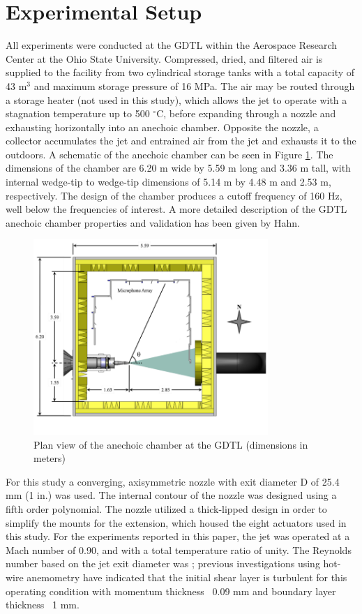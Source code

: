 \documentclass[english]{aiaa-tc}
\begin{document}
\section{Experimental Setup}
All experiments were conducted at the GDTL within the Aerospace Research Center at the Ohio State University. Compressed, dried, and filtered air is supplied to the facility from two cylindrical storage tanks with a total capacity of 43 m$^3$ and maximum storage pressure of 16 MPa. The air may be routed through a storage heater (not used in this study), which allows the jet to operate with a stagnation temperature up to 500 $^\circ$C, before expanding through a nozzle and exhausting horizontally into an anechoic chamber. Opposite the nozzle, a collector accumulates the jet and entrained air from the jet and exhausts it to the outdoors. A schematic of the anechoic chamber can be seen in Figure \ref{GDTLschematic}. The dimensions of the chamber are 6.20 m wide by 5.59 m long and 3.36 m tall, with internal wedge-tip to wedge-tip dimensions of 5.14 m by 4.48 m and 2.53 m, respectively. The design of the chamber produces a cutoff frequency of 160 Hz, well below the frequencies of interest. A more detailed description of the GDTL anechoic chamber properties and validation has been given by Hahn\cite{Hahn2011}.
\begin{figure}
\begin{center}
	\includegraphics[width=3.5in]{GDTL_facility_schematic}
    \caption{Plan view of the anechoic chamber at the GDTL (dimensions in meters)}\label{GDTLschematic}
\end{center}
\end{figure}

For this study a converging, axisymmetric nozzle with exit diameter D of 25.4 mm (1 in.) was used. The internal contour of the nozzle was designed using a fifth order polynomial. The nozzle utilized a thick-lipped design in order to simplify the mounts for the extension, which housed the eight actuators used in this study. For the experiments reported in this paper, the jet was operated at a Mach number of 0.90, and with a total temperature ratio of unity. The Reynolds number based on the jet exit diameter was ; previous investigations using hot-wire anemometry have indicated that the initial shear layer is turbulent for this operating condition with momentum thickness ~0.09 mm and boundary layer thickness ~1 mm\cite{kfm2009-1}.
\end{document}
